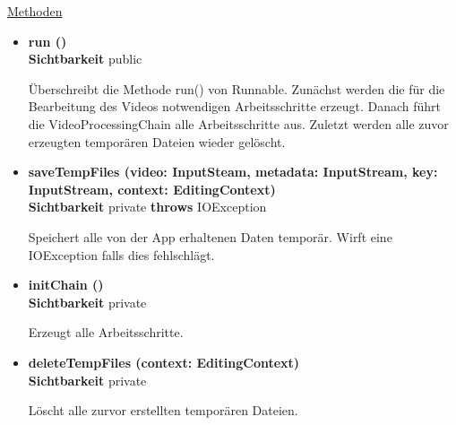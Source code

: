 \underline{Methoden}
\begin{itemize}
\itemsep0pt
\item \textbf{run ()}\hfill\\
\textbf{Sichtbarkeit} public

Überschreibt die Methode run() von Runnable. Zunächst werden die für die Bearbeitung des Videos notwendigen Arbeitsschritte erzeugt. Danach führt die VideoProcessingChain alle Arbeitsschritte aus. Zuletzt werden alle zuvor erzeugten temporären Dateien wieder gelöscht.

\item \textbf{saveTempFiles (video: InputSteam, metadata: InputStream, 
key: InputStream, context: EditingContext)}\hfill\\
\textbf{Sichtbarkeit} private \newline
\textbf{throws} IOException 

Speichert alle von der App erhaltenen Daten temporär. Wirft eine IOException falls dies fehlschlägt.

\item \textbf{initChain ()}\hfill\\
\textbf{Sichtbarkeit} private

Erzeugt alle Arbeitsschritte.

\item \textbf{deleteTempFiles (context: EditingContext)}\hfill\\
\textbf{Sichtbarkeit} private

Löscht alle zurvor erstellten temporären Dateien.

\end{itemize}